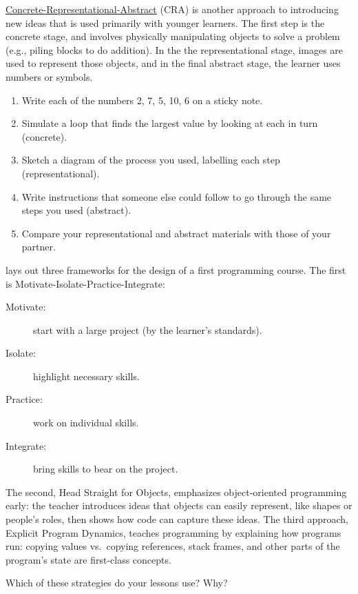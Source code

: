 
\href{https://makingeducationfun.wordpress.com/2012/04/29/concrete-representational-abstract-cra/}{Concrete-Representational-Abstract}
(CRA) is another approach to introducing new ideas that is used
primarily with younger learners.  The first step is the concrete
stage, and involves physically manipulating objects to solve a problem
(e.g., piling blocks to do addition).  In the the representational
stage, images are used to represent those objects, and in the final
abstract stage, the learner uses numbers or symbols.

\begin{enumerate}

\item
  Write each of the numbers 2, 7, 5, 10, 6 on a sticky note.

\item
  Simulate a loop that finds the largest value by looking at each in
  turn (concrete).

\item
  Sketch a diagram of the process you used, labelling each step
  (representational).

\item
  Write instructions that someone else could follow to go through the
  same steps you used (abstract).

\item
  Compare your representational and abstract materials with those of
  your partner.
  
\end{enumerate}


\cite{Sorv2014} lays out three frameworks for the design of a first
programming course. The first is Motivate-Isolate-Practice-Integrate:

\begin{description}

\item[Motivate:] start with a large project (by the learner's
  standards).

\item[Isolate:] highlight necessary skills.

\item[Practice:] work on individual skills.

\item[Integrate:] bring skills to bear on the project.

\end{description}

The second, Head Straight for Objects, emphasizes object-oriented
programming early: the teacher introduces ideas that objects can
easily represent, like shapes or people's roles, then shows how code
can capture these ideas.  The third approach, Explicit Program
Dynamics, teaches programming by explaining how programs run: copying
values vs.\ copying references, stack frames, and other parts of the
program's state are first-class concepts.

Which of these strategies do your lessons use? Why?
